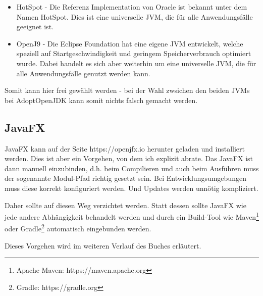 \begin{itemize}
\item HotSpot - Die Referenz Implementation von Oracle ist bekannt unter dem Namen HotSpot. Dies ist eine universelle JVM, die für alle Anwendungsfälle geeignet ist.
\item OpenJ9 - Die Eclipse Foundation hat eine eigene JVM entwickelt, welche speziell auf Startgeschwindigkeit und geringem Speicherverbrauch optimiert wurde. Dabei handelt es sich aber weiterhin um eine universelle JVM, die für alle Anwendungsfälle genutzt werden kann.
\end{itemize}

Somit kann hier frei gewählt werden - bei der Wahl zwsichen den beiden JVMs bei AdoptOpenJDK kann somit nichts falsch gemacht werden.

\subsection{JavaFX}
JavaFX kann auf der Seite https://openjfx.io herunter geladen und installiert werden. Dies ist aber ein Vorgehen, von dem ich explizit abrate. Das JavaFX ist dann manuell einzubinden, d.h. beim Compilieren und auch beim Ausführen muss der sogenannte Modul-Pfad richtig gesetzt sein. Bei Entwicklungsumgebungen muss diese korrekt konfiguriert werden. Und Updates werden unnötig kompliziert.

Daher sollte auf diesen Weg verzichtet werden. Statt dessen sollte JavaFX wie jede andere Abhängigkeit behandelt werden und durch ein Build-Tool wie Maven\footnote{Apache Maven: https://maven.apache.org} oder Gradle\footnote{Gradle: https://gradle.org} automatisch eingebunden werden.

Dieses Vorgehen wird im weiteren Verlauf des Buches erläutert.

